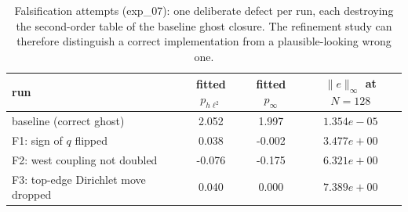 \begin{table}[H]
\centering\small
\caption{Falsification attempts (exp\_07): one deliberate defect per run, each destroying the second-order table of the baseline ghost closure.  The refinement study can therefore distinguish a correct implementation from a plausible-looking wrong one.}
\label{tab:falsification}
\begin{tabular}{lccc}
\toprule
run & fitted $p_{h\ell^2}$ & fitted $p_\infty$ & $\lVert e\rVert_\infty$ at $N=128$ \\
\midrule
baseline (correct ghost) & 2.052 & 1.997 & $1.354e-05$ \\
F1: sign of $q$ flipped & 0.038 & -0.002 & $3.477e+00$ \\
F2: west coupling not doubled & -0.076 & -0.175 & $6.321e+00$ \\
F3: top-edge Dirichlet move dropped & 0.040 & 0.000 & $7.389e+00$ \\
\bottomrule
\end{tabular}
\end{table}